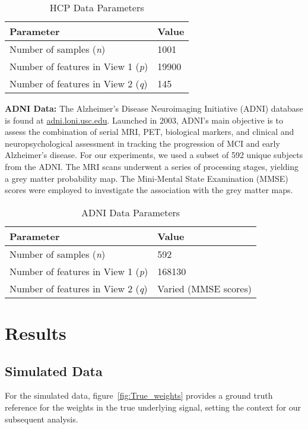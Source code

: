 \begin{table}[h]
\centering
\caption{HCP Data Parameters}
\begin{tabular}{| l | l |}
\hline
\textbf{Parameter} & \textbf{Value} \\
\hline
Number of samples (\textit{n}) & 1001 \\
Number of features in View 1 (\textit{p}) & 19900 \\
Number of features in View 2 (\textit{q}) & 145 \\
\hline
\end{tabular}
\label{table:hcp-parameters}
\end{table}

\textbf{ADNI Data:}
The Alzheimer’s Disease Neuroimaging Initiative (ADNI) database is found at \url{adni.loni.usc.edu}.
Launched in 2003, ADNI's main objective is to assess the combination of serial MRI, PET, biological markers, and clinical and neuropsychological assessment in tracking the progression of MCI and early Alzheimer’s disease.
For our experiments, we used a subset of 592 unique subjects from the ADNI. The MRI scans underwent a series of processing stages, yielding a grey matter probability map.
The Mini-Mental State Examination (MMSE) scores were employed to investigate the association with the grey matter maps.

\begin{table}[h]
\centering
\caption{ADNI Data Parameters}
\begin{tabular}{| l | l |}
\hline
\textbf{Parameter} & \textbf{Value} \\
\hline
Number of samples (\textit{n}) & 592 \\
Number of features in View 1 (\textit{p}) & 168130 \\
Number of features in View 2 (\textit{q}) & Varied (MMSE scores) \\
\hline
\end{tabular}
\label{table:adni-parameters}
\end{table}

\section{Results}

\subsection{Simulated Data}

For the simulated data, figure~\ref{fig:True_weights} provides a ground truth reference for the weights in the true
underlying signal, setting the context for our subsequent analysis.

